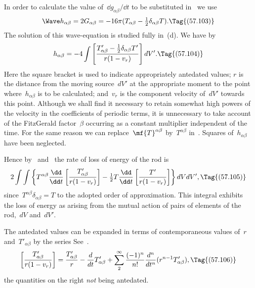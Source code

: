 \documentclass[12pt]{book}
\begin{document}
In order to calculate the value of~$\dd g_{\alpha\beta}/\dd t$ to be substituted in~ we use~
\[
\Wave h_{\alpha\beta} = 2 G_{\alpha\beta} = -16\pi(T_{\alpha\beta} - \tfrac{1}{2}\delta_{\alpha\beta} T).
\Tag{(57.103)}
\]
The solution of this wave\hyp{}equation is studied fully in~(d).
We have by~
\[
h_{\alpha\beta} = -4 \int\left[\frac{T'_{\alpha\beta} - \tfrac{1}{2}\delta_{\alpha\beta} T'}{r(1-v_r)}\right] dV'.
\Tag{(57.104)}
\]
Here the square bracket is used to indicate appropriately antedated values; $r$ is the distance from the moving
source~$dV'$ at the appropriate moment to the point where~$h_{\alpha\beta}$ is to be calculated;
and~$v_r$ is the component velocity of~$dV'$ towards this point.
Although we shall find it necessary to retain somewhat high powers of the velocity in the coefficients of
periodic terms, it is unnecessary to take account of the FitzGerald factor~$\beta$ occurring as a constant multiplier
independent of the time.
For the same reason we can replace~$\mf{T}^{\alpha\beta}$ by~$T^{\alpha\beta}$ in~.
Squares of~$h_{\alpha\beta}$ have been neglected.

Hence by~ and~ the rate of loss of energy of the rod is
\[
2\int\int\left\{T^{\alpha\beta}\frac{\dd}{\dd t}\left[\frac{T'_{\alpha\beta}}{r(1-v_r)}\right] - \tfrac{1}{2} T\frac{\dd}{\dd t}\left[\frac{T'}{r(1-v_r)}\right]\right\} dV dV',
\Tag{(57.105)}
\]
since~$T^{\alpha\beta}\delta_{\alpha\beta}=T$ to the adopted order of approximation.
This integral exhibits the loss of energy as arising from the mutual action of pairs of elements of
the rod,~$dV$ and~$dV'$.

The antedated values can be expanded in terms of contemporaneous values of~$r$ and~$T'_{\alpha\beta}$
by the series\footnotemark\footnotetext
      {See~.}
\[
\left[\frac{T'_{\alpha\beta}}{r(1-v_r)}\right] = \frac{T'_{\alpha\beta}}{r} - \frac{d}{dt}T'_{\alpha\beta} +
                 \sum_2^\infty\frac{(-1)^n}{n!}\frac{d^n}{dt^n}(r^{n-1}T'_{\alpha\beta}),
\Tag{(57.106)}
\]
the quantities on the right \emph{not} being antedated.
\end{document}
